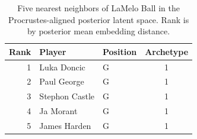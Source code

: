 \begin{table}[htbp]
  \centering\small
  \begin{tabular}{rllc}
    \toprule
    Rank & Player & Position & Archetype \\
    \midrule
    1 & Luka Doncic & G & 1 \\
    2 & Paul George & G & 1 \\
    3 & Stephon Castle & G & 1 \\
    4 & Ja Morant & G & 1 \\
    5 & James Harden & G & 1 \\
    \bottomrule
  \end{tabular}
  \caption{Five nearest neighbors of LaMelo Ball in the Procrustes-aligned posterior latent space. Rank is by posterior mean embedding distance.}
  \label{tab:LaMelo_Ball_neighbors}
\end{table}

